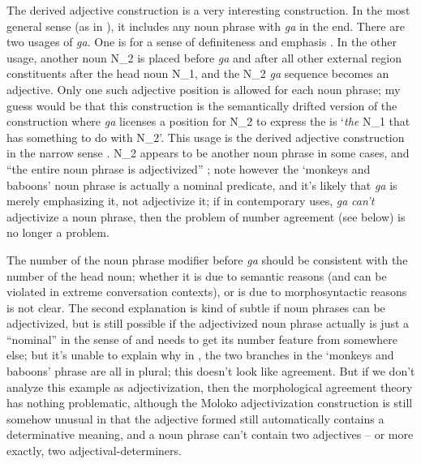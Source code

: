 \documentclass[a4paper, oneside, 12pt]{report}
\newcommand*{\citesec}[1]{\S~{#1}}
\newcommand*{\citefig}[1]{Fig.~{#1}}
\newcommand*{\citepage}[1]{p.~{#1}}
\newcommand*{\citepages}[1]{pp.~{#1}}
\newcommand{\form}[1]{\emph{#1}}
\newcommand{\translate}[1]{`#1'}
\begin{document}
The derived adjective construction is a very interesting construction.
In the most general sense (as in \citet[\citefig{5.1}]{friesen2017grammar}),
it includes any noun phrase with \form{ga} in the end.
There are two usages of \form{ga}.
One is for a sense of definiteness and emphasis \citep[\citesec{5.3.2}]{friesen2017grammar}.
In the other usage, 
another noun N_2 is placed before \form{ga} 
and after all other external region constituents
after the head noun N_1, 
and the N_2 \form{ga} sequence becomes an adjective. 
Only one such adjective position is allowed for each noun phrase; 
my guess would be that this construction is the semantically drifted version of 
the construction where \form{ga} 
licenses a position for N_2 to express
the is \translate{\emph{the} N_1 that has something to do with N_2}.
This usage is the derived adjective construction in the narrow sense 
\citep[\citepages{149-152}]{friesen2017grammar}.
N_2 appears to be another noun phrase in some cases, 
and ``the entire noun phrase is adjectivized''
\citep[\citepage{151, (45)}]{friesen2017grammar}; 
note however the \translate{monkeys and baboons} 
noun phrase is actually a nominal predicate, 
and it's likely that \form{ga} is merely emphasizing it, 
not adjectivize it; 
if in contemporary uses, \form{ga} \emph{can't} adjectivize 
a noun phrase, then the problem of number agreement (see below) 
is no longer a problem.

The number of the noun phrase modifier before \form{ga} 
should be consistent with the number of the head noun; 
whether it is due to semantic reasons  
(and can be violated in extreme conversation contexts),
or is due to morphosyntactic reasons is not clear.
The second explanation is 
kind of subtle if noun phrases can be adjectivized, 
but is still possible if the adjectivized noun phrase 
actually is just a ``nominal'' in the sense of \citet{cgel}
and needs to get its number feature from somewhere else; 
but it's unable to explain why in \citet[\citepage{151, (45)}]{friesen2017grammar},
the two branches in the \translate{monkeys and baboons} phrase are all in plural; 
this doesn't look like agreement.
But if we don't analyze this example as adjectivization, 
then the morphological agreement theory has nothing problematic, 
although the Moloko adjectivization construction is still somehow unusual 
in that the adjective formed still automatically contains a determinative meaning, 
and a noun phrase can't contain two adjectives -- 
or more exactly, two adjectival-determiners.
\end{document}
